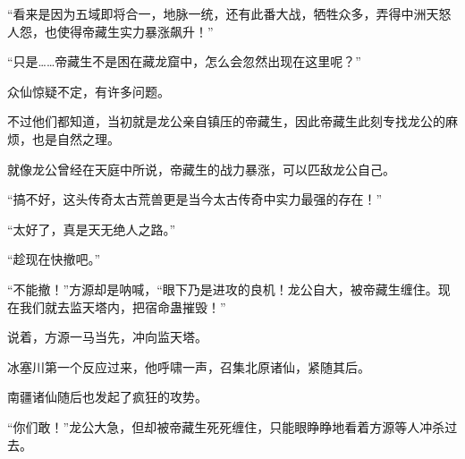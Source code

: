 \begin{this_body}
“看来是因为五域即将合一，地脉一统，还有此番大战，牺牲众多，弄得中洲天怒人怨，也使得帝藏生实力暴涨飙升！”

“只是……帝藏生不是困在藏龙窟中，怎么会忽然出现在这里呢？”

众仙惊疑不定，有许多问题。

不过他们都知道，当初就是龙公亲自镇压的帝藏生，因此帝藏生此刻专找龙公的麻烦，也是自然之理。

就像龙公曾经在天庭中所说，帝藏生的战力暴涨，可以匹敌龙公自己。

“搞不好，这头传奇太古荒兽更是当今太古传奇中实力最强的存在！”

“太好了，真是天无绝人之路。”

“趁现在快撤吧。”

“不能撤！”方源却是呐喊，“眼下乃是进攻的良机！龙公自大，被帝藏生缠住。现在我们就去监天塔内，把宿命蛊摧毁！”

说着，方源一马当先，冲向监天塔。

冰塞川第一个反应过来，他呼啸一声，召集北原诸仙，紧随其后。

南疆诸仙随后也发起了疯狂的攻势。

“你们敢！”龙公大急，但却被帝藏生死死缠住，只能眼睁睁地看着方源等人冲杀过去。

\end{this_body}

